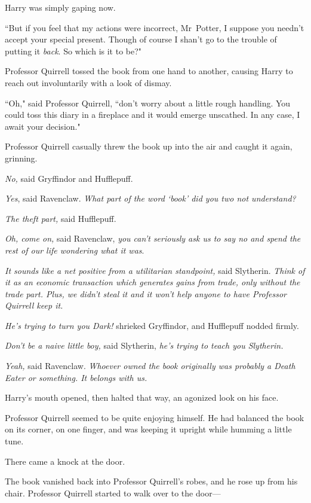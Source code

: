Harry was simply gaping now.

``But if you feel that my actions were incorrect, Mr~Potter, I suppose you needn't accept your special present. Though of course I shan't go to the trouble of putting it \emph{back}. So which is it to be?"

Professor Quirrell tossed the book from one hand to another, causing Harry to reach out involuntarily with a look of dismay.

``Oh," said Professor Quirrell, ``don't worry about a little rough handling. You could toss this diary in a fireplace and it would emerge unscathed. In any case, I await your decision."

Professor Quirrell casually threw the book up into the air and caught it again, grinning.

\emph{No,} said Gryffindor and Hufflepuff.

\emph{Yes}, said Ravenclaw. \emph{What part of the word `book' did you two not understand?}

\emph{The theft part,} said Hufflepuff.

\emph{Oh, come on,} said Ravenclaw, \emph{you can't seriously ask us to say no and spend the rest of our life wondering what it was}.

\emph{It sounds like a net positive from a utilitarian standpoint,} said Slytherin. \emph{Think of it as an economic transaction which generates gains from trade, only without the trade part. Plus, \emph{we} didn't steal it and it won't help anyone to have Professor Quirrell keep it.}

\emph{He's trying to turn you Dark!} shrieked Gryffindor, and Hufflepuff nodded firmly.

\emph{Don't be a naive little boy,} said Slytherin, \emph{he's trying to teach you Slytherin.}

\emph{Yeah,} said Ravenclaw. \emph{Whoever owned the book originally was probably a Death Eater or something. It belongs with us.}

Harry's mouth opened, then halted that way, an agonized look on his face.

Professor Quirrell seemed to be quite enjoying himself. He had balanced the book on its corner, on one finger, and was keeping it upright while humming a little tune.

There came a knock at the door.

The book vanished back into Professor Quirrell's robes, and he rose up from his chair. Professor Quirrell started to walk over to the door—

